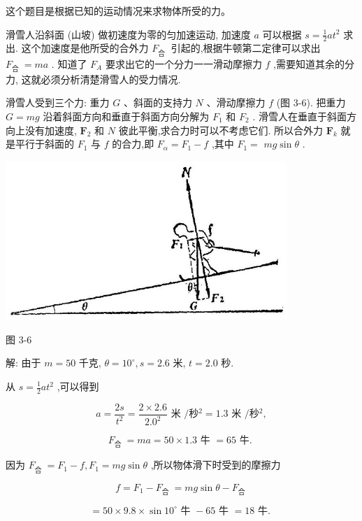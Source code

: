 \documentclass[10pt]{article}
\begin{document}
这个题目是根据已知的运动情况来求物体所受的力。

滑雪人沿斜面 (山坡) 做初速度为零的匀加速运动, 加速度 \(a\) 可以根据 \(s = \frac{1}{2}a{t}^{2}\) 求出. 这个加速度是他所受的合外力 \({F}_{\text{合 }}\) 引起的,根据牛顿第二定律可以求出 \({F}_{\text{合 }} = {ma}\) . 知道了 \({F}_{A}\) 要求出它的一个分力一一滑动摩擦力 \(f\) ,需要知道其余的分力, 这就必须分析清楚滑雪人的受力情况.

滑雪人受到三个力: 重力 \(G\) 、斜面的支持力 \(N\) 、滑动摩擦力 \(f\) (图 3-6). 把重力 \(G = {mg}\) 沿着斜面方向和垂直于斜面方向分解为 \({F}_{1}\) 和 \({F}_{2}\) . 滑雪人在垂直于斜面方向上没有加速度, \({\mathbf{F}}_{2}\) 和 \(N\) 彼此平衡,求合力时可以不考虑它们. 所以合外力 \({\mathbf{F}}_{k}\) 就是平行于斜面的 \({F}_{1}\) 与 \(f\) 的合力,即 \({F}_{\alpha } = {F}_{1} - f\) ,其中 \({F}_{1} =\) \({mg}\sin \theta\) .

\begin{center}
\includegraphics[max width=0.8\textwidth]{images/01912d55-147c-70aa-b0e0-1782a122f948_107_546548.jpg}
\end{center}

图 3-6

解: 由于 \(m = {50}\) 千克, \(\theta = {10}^{ \circ },s = {2.6}\) 米, \(t = {2.0}\) 秒.

从 \(s = \frac{1}{2}a{t}^{2}\) ,可以得到

\[
a = \frac{2s}{{t}^{2}} = \frac{2 \times {2.6}}{{2.0}^{2}}\text{ 米 }/秒{}^{2} = {1.3}\text{ 米 }/秒{}^{2},
\]

\[
{F}_{\text{合 }} = {ma} = {50} \times {1.3}\text{ 牛 } = {65}\text{ 牛. }
\]

因为 \({F}_{\text{合 }} = {F}_{1} - f,{F}_{1} = {mg}\sin \theta\) ,所以物体滑下时受到的摩擦力

\[
f = {F}_{1} - {F}_{\text{合 }} = {mg}\sin \theta - {F}_{\text{合 }}
\]

\[
= {50} \times {9.8} \times \sin {10}^{ \circ }\text{ 牛 } - {65}\text{ 牛 } = {18}\text{ 牛. }
\]
\end{document}
